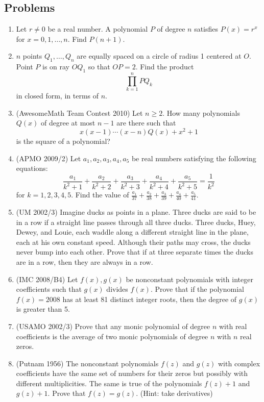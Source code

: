 \subsection{Problems}
\begin{enumerate}
\item Let $r\neq 0$ be a real number. A polynomial $P$ of degree $n$ satisfies $P(x)=r^x$ for $x=0,1,\ldots ,n$. Find $P(n+1)$.

\item $n$ points $Q_1,\ldots, Q_n$ are equally spaced on a circle of radius 1 centered at $O$. Point $P$ is on ray $OQ_1$ so that $OP=2$. Find the product
\[\prod_{k=1}^n PQ_k\]
in closed form, in terms of $n$.

\item (AwesomeMath Team Contest 2010) Let $n\geq 2$. How many polynomials $Q(x)$ of degree at most $n-1$ are there such that
\[x(x-1)\cdots (x-n)Q(x)+x^2+1\]
is the square of a polynomial?

\item (APMO 2009/2) Let $a_1,a_2,a_3,a_4,a_5$ be real numbers satisfying the following equations:
\[\frac{a_1}{k^2+1}+\frac{a_2}{k^2+2}+\frac{a_3}{k^2+3}+\frac{a_4}{k^2+4}+\frac{a_5}{k^2+5}=\frac{1}{k^2}\]
for $k=1,2,3,4,5$. Find the value of $\frac{a_1}{37}+\frac{a_2}{38}+\frac{a_3}{39}+\frac{a_4}{40}+\frac{a_5}{41}$.

\item (UM 2002/3) Imagine ducks as points in a plane. Three ducks are said to be in a row if a straight line passes through all three ducks. Three ducks, Huey, Dewey, and Louie, each waddle along a different straight line in the plane, each at his own constant speed. Although their paths may cross, the ducks never bump into each other. Prove that if at three separate times the ducks are in a row, then they are always in a row. 

\item (IMC 2008/B4) Let $f(x),g(x)$ be nonconstant polynomials with integer coefficients such that $g(x)$ divides $f(x)$. Prove that if the polynomial $f(x)=2008$ has at least 81 distinct integer roots, then the degree of $g(x)$ is greater than 5.

\item (USAMO 2002/3) Prove that any monic polynomial of degree $n$ with real coefficients is the average of two monic polynomials of degree $n$ with $n$ real zeros.
\item (Putnam 1956) The nonconstant polynomials $f(z)$ and $g(z)$ with complex coefficients have the same set of numbers for their zeros but possibly with different multiplicities. The same is true of the polynomials $f(z)+1$ and $g(z)+1$. Prove that $f(z)=g(z)$. (Hint: take derivatives)
\end{enumerate}
